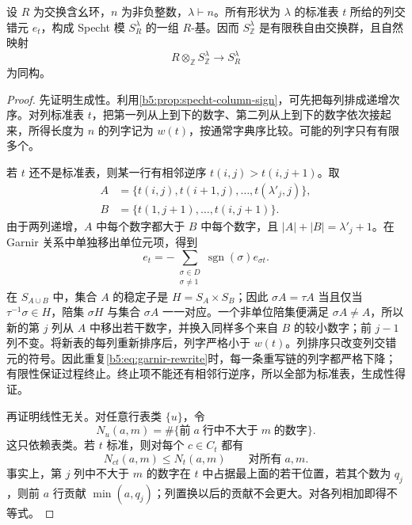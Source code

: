 \begin{theorem}[标准基]\label{b5:thm:specht-standard-basis}
	设 \(R\) 为交换含幺环，\(n\) 为非负整数，\(\lambda\vdash n\)。所有形状为 \(\lambda\) 的标准表 \(t\) 所给的列交错元 \(e_t\)，构成 Specht 模 \(S_R^\lambda\) 的一组 \(R\)-基。因而 \(S_{\mathbb Z}^\lambda\) 是有限秩自由交换群，且自然映射
	\[
		R\otimes_{\mathbb Z}S_{\mathbb Z}^\lambda\longrightarrow S_R^\lambda
	\]
	为同构。
\end{theorem}
\begin{proof}
	先证明生成性。利用\cref{b5:prop:specht-column-sign}，可先把每列排成递增次序。对列标准表 \(t\)，把第一列从上到下的数字、第二列从上到下的数字依次接起来，所得长度为 \(n\) 的列字记为 \(w(t)\)，按通常字典序比较。可能的列字只有有限多个。

	若 \(t\) 还不是标准表，则某一行有相邻逆序 \(t(i,j)>t(i,j+1)\)。取
	\[
		\begin{aligned}
			A&=\bigl\{t(i,j),t(i+1,j),\ldots,t(\lambda'_j,j)\bigr\},\\
			B&=\bigl\{t(1,j+1),\ldots,t(i,j+1)\bigr\}.
		\end{aligned}
	\]
	由于两列递增，\(A\) 中每个数字都大于 \(B\) 中每个数字，且 \(|A|+|B|=\lambda'_j+1\)。在 Garnir 关系中单独移出单位元项，得到
	\begin{equation}\label{b5:eq:garnir-rewrite}
		e_t=-\sum_{\substack{\sigma\in D\\\sigma\ne1}} \operatorname{sgn}(\sigma)e_{\sigma t}.
	\end{equation}
	在 \(S_{A\cup B}\) 中，集合 \(A\) 的稳定子是 \(H=S_A\times S_B\)；因此 \(\sigma A=\tau A\) 当且仅当 \(\tau^{-1}\sigma\in H\)，陪集 \(\sigma H\) 与集合 \(\sigma A\) 一一对应。一个非单位陪集便满足 \(\sigma A\ne A\)，所以新的第 \(j\) 列从 \(A\) 中移出若干数字，并换入同样多个来自 \(B\) 的较小数字；前 \(j-1\) 列不变。将新表的每列重新排序后，列字严格小于 \(w(t)\)。列排序只改变列交错元的符号。因此重复\eqref{b5:eq:garnir-rewrite}时，每一条重写链的列字都严格下降；有限性保证过程终止。终止项不能还有相邻行逆序，所以全部为标准表，生成性得证。

	再证明线性无关。对任意行表类 \(\{u\}\)，令
	\[
		N_u(a,m)=\#\{\text{前}\;a\;\text{行中不大于}\;m\;\text{的数字}\}.
	\]
	这只依赖表类。若 \(t\) 标准，则对每个 \(c\in C_t\) 都有
	\begin{equation}\label{b5:eq:tabloid-triangular}
		N_{ct}(a,m)\leq N_t(a,m)\qquad\text{对所有}\;a,m.
	\end{equation}
	事实上，第 \(j\) 列中不大于 \(m\) 的数字在 \(t\) 中占据最上面的若干位置，若其个数为 \(q_j\)，则前 \(a\) 行贡献 \(\min(a,q_j)\)；列置换以后的贡献不会更大。对各列相加即得不等式。


\end{proof}
